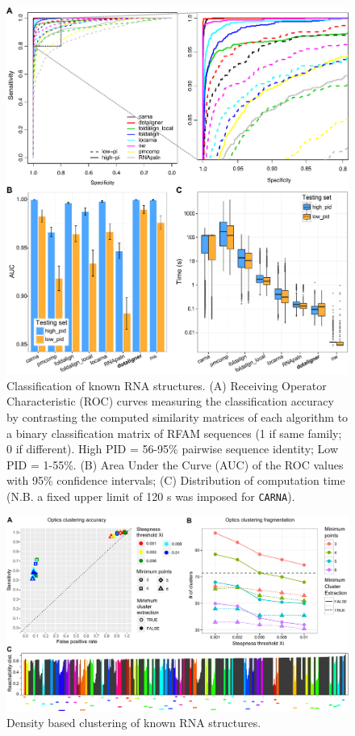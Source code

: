 \documentclass[a4paper,11pt]{article}
\newcommand\carna{\texttt{CARNA}}
\begin{document}
\begin{figure}
 \includegraphics[width=\textwidth]{fig2}
 \caption { Classification of known RNA structures. 
 (A) Receiving Operator Characteristic (ROC) curves measuring the classification
 accuracy by contrasting the computed similarity matrices of each algorithm 
 to a binary classification matrix of RFAM  sequences (1 if same family; 
 0 if different). High PID =  56-95\% pairwise sequence identity; Low PID  = 1-55\%.
 (B) Area Under the Curve (AUC) of the ROC values with 95\% confidence intervals; 
 (C) Distribution of computation time (N.B. a fixed upper limit of 120 s was 
 imposed for \carna{}). 
 }
\end{figure}

  \begin{figure}
 \includegraphics[width=\textwidth]{fig3}
 \caption { Density based clustering of known  RNA structures. 
 }
\end{figure}
\end{document}
